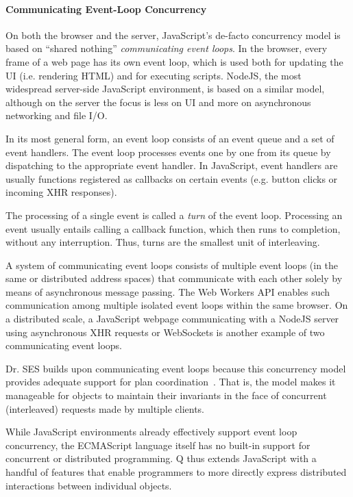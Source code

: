 \documentclass{llncs}
\begin{document}
\paragraph{Communicating Event-Loop Concurrency}

On both the browser and the server, JavaScript's de-facto concurrency model is based on ``shared nothing'' \emph{communicating event loops}. In the browser, every frame of a web page has its own event loop, which is used both for updating the UI (i.e. rendering HTML) and for executing scripts. NodeJS, the most widespread server-side JavaScript environment, is based on a similar model, although on the server the focus is less on UI and more on asynchronous networking and file I/O.

In its most general form, an event loop consists of an event queue and a set of event handlers. The event loop processes events one by one from its queue by dispatching to the appropriate event handler. In JavaScript, event handlers are usually functions registered as callbacks on certain events (e.g. button clicks or incoming XHR responses).

The processing of a single event is called a \emph{turn} of the event loop. Processing an event usually entails calling a callback function, which then runs to completion, without any interruption. Thus, turns are the smallest unit of interleaving.

A system of communicating event loops consists of multiple event loops (in the same or distributed address spaces) that communicate with each other solely by means of asynchronous message passing. The Web Workers API enables such communication among multiple isolated event loops within the same browser. On a distributed scale, a JavaScript webpage communicating with a NodeJS server using asynchronous XHR requests or WebSockets is another example of two communicating event loops.

Dr. SES builds upon communicating event loops because this concurrency model provides adequate support for plan coordination~\cite{miller:strangers}. That is, the model makes it manageable for objects to maintain their invariants in the face of concurrent (interleaved) requests made by multiple clients.

While JavaScript environments already effectively support event loop concurrency, the ECMAScript language itself has no built-in support for concurrent or distributed programming. Q thus extends JavaScript with a handful of features that enable programmers to more directly express distributed interactions between individual objects.
\end{document}
